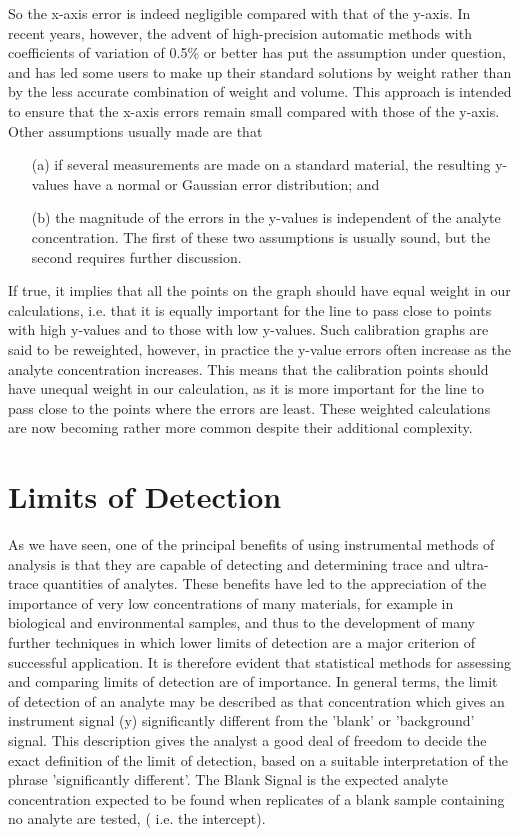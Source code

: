 So the x-axis error is indeed negligible compared with that of the y-axis. In recent years, however, the advent of high-precision automatic methods with coefficients of variation of 0.5\% or better has put the assumption under question, and has led some users to make up their standard solutions by weight rather than by the less accurate combination of weight and volume. This approach is intended to ensure that the x-axis errors remain small compared with those of the y-axis.
Other assumptions usually made are that
\begin{itemize}
\item[(a)] if several measurements are made on a standard material, the resulting y-values have a normal or Gaussian error distribution; and
\item[(b)] the magnitude of the errors in the y-values is independent of the analyte concentration. The first of these two assumptions is usually sound, but the second requires further discussion.
\end{itemize}
If true, it implies that all the points on the graph should have equal weight in our calculations, i.e. that it is equally important for the line to pass close to points with high y-values and to those with low y-values. Such calibration graphs are said to be reweighted, however, in practice the y-value
errors often increase as the analyte concentration increases. This means that the calibration points should have unequal weight in our calculation, as it is more important for the line to pass close to the points where the errors are least. These weighted calculations are now becoming rather more common despite their additional complexity.

\section{Limits of Detection}
As we have seen, one of the principal benefits of using instrumental methods of analysis is that they are capable of detecting and determining trace and ultra-trace quantities of analytes.
These benefits have led to the appreciation of the importance of very low concentrations of many materials, for example in biological and environmental samples, and thus to the development of many further techniques in which lower limits of detection are a major criterion of successful application. It is therefore evident that statistical methods for assessing and comparing limits of detection are of importance.
In general terms, the limit of detection of an analyte may be described as that concentration which gives an instrument signal (y) significantly different from the 'blank' or 'background’ signal. This description gives the analyst a good deal of freedom to decide the exact definition of the limit of detection, based on a suitable interpretation of the phrase 'significantly different'.
The Blank Signal is the expected analyte concentration expected to be found when
replicates of a blank sample containing no analyte are tested, ( i.e. the intercept).


